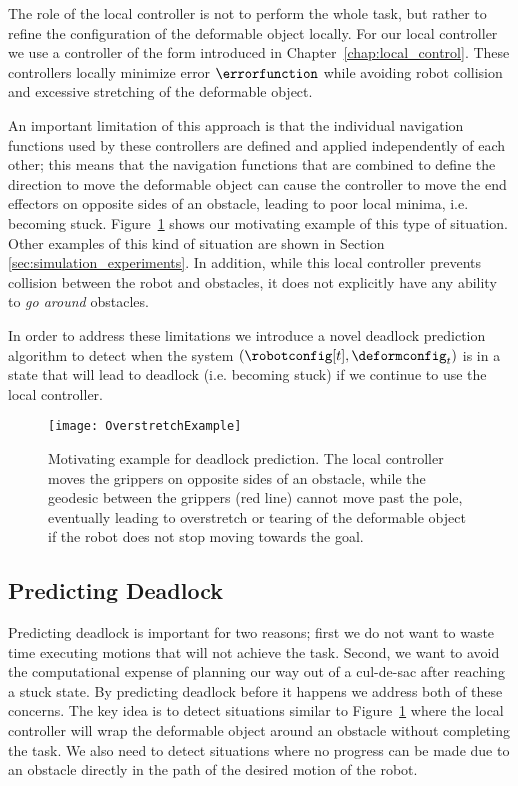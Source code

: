 The role of the local controller is not to perform the whole task, but rather to refine the configuration of the deformable object locally. For our local controller we use a controller of the form introduced in Chapter~\ref{chap:local_control}. These controllers locally minimize error $\errorfunction$ while avoiding robot collision and excessive stretching of the deformable object.

An important limitation of this approach is that the individual navigation functions used by these controllers are defined and applied independently of each other; this means that the navigation functions that are combined to define the direction to move the deformable object can cause the controller to move the end effectors on opposite sides of an obstacle, leading to poor local minima, i.e. becoming stuck. Figure~\ref{fig:overstretch_example} shows our motivating example of this type of situation. Other examples of this kind of situation are shown in Section \ref{sec:simulation_experiments}. In addition, while this local controller prevents collision between the robot and obstacles, it does not explicitly have any ability to \textit{go around} obstacles.

In order to address these limitations we introduce a novel deadlock prediction algorithm to detect when the system $(\robotconfig[t], \deformconfig_t)$ is in a state that will lead to deadlock (i.e. becoming stuck) if we continue to use the local controller.


\begin{figure}[t]
    \centering
    \texttt{[image: OverstretchExample]}
    \caption{Motivating example for deadlock prediction. The local controller moves the grippers on opposite sides of an obstacle, while the geodesic between the grippers (red line) cannot move past the pole, eventually leading to overstretch or tearing of the deformable object if the robot does not stop moving towards the goal.}
    \label{fig:overstretch_example}
\end{figure}



\subsection{Predicting Deadlock}
\label{sec:predicting_deadlock}



Predicting deadlock is important for two reasons; first we do not want to waste time executing motions that will not achieve the task. Second, we want to avoid the computational expense of planning our way out of a cul-de-sac after reaching a stuck state. By predicting deadlock before it happens we address both of these concerns. The key idea is to detect situations similar to Figure~\ref{fig:overstretch_example} where the local controller will wrap the deformable object around an obstacle without completing the task. We also need to detect situations where no progress can be made due to an obstacle directly in the path of the desired motion of the robot.



